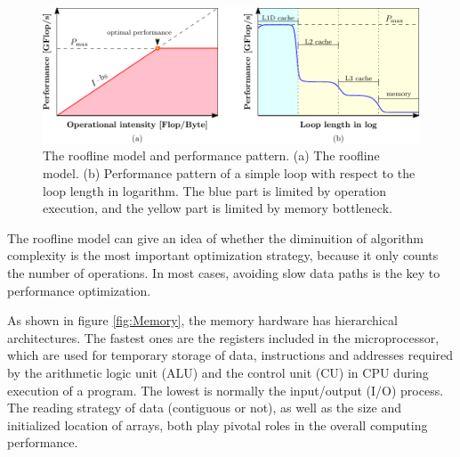 \begin{figure}[h]
\begin{centering}
\includegraphics[width=1\columnwidth]{_figure/roofline}
\par\end{centering}
\caption[The roofline model and performance pattern]{The roofline model and performance pattern. (a) The roofline model.
(b) Performance pattern of a simple loop with respect to the loop
length in logarithm. The blue part is limited by operation execution,
and the yellow part is limited by memory bottleneck. \label{fig:The-roofline-model}}
\end{figure}

The roofline model can give an idea of whether the diminuition of
algorithm complexity is the most important optimization strategy,
because it only counts the number of operations. In most cases, avoiding
slow data paths is the key to performance optimization.

As shown in figure \ref{fig:Memory}, the memory hardware has hierarchical
architectures. The fastest ones are the registers included in the
microprocessor, which are used for temporary storage of data, instructions
and addresses required by the arithmetic logic unit (ALU) and the
control unit (CU) in CPU during execution of a program. The lowest
is normally the input/output (I/O) process. The reading strategy of
data (contiguous or not), as well as the size and initialized location
of arrays, both play pivotal roles in the overall computing performance.

